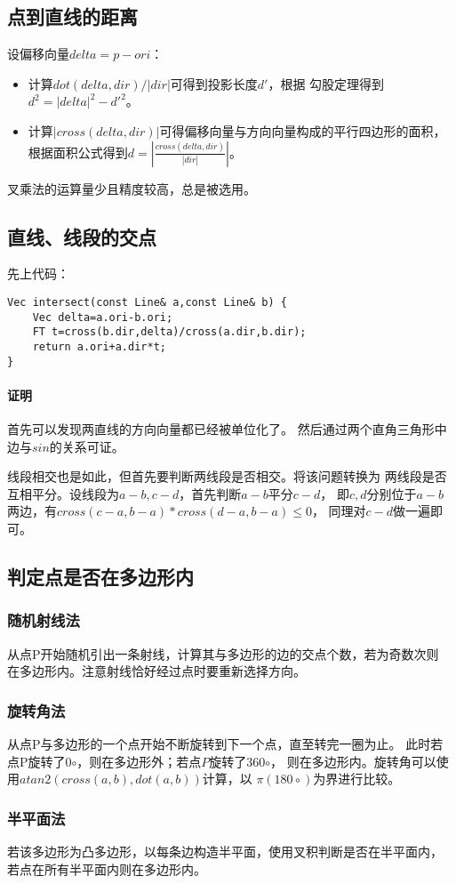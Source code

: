 \subsection{点到直线的距离}
设偏移向量$delta=p-ori$：
\begin{itemize}
	\item 计算$dot(delta,dir)/|dir|$可得到投影长度$d'$，根据
	      勾股定理得到$d^2=|delta|^2-d'^2$。
	\item 计算$|cross(delta,dir)|$可得偏移向量与方向向量构成的平行四边形的面积，
	      根据面积公式得到$d=|\frac{cross(delta,dir)}{|dir|}|$。
\end{itemize}
叉乘法的运算量少且精度较高，总是被选用。
\subsection{直线、线段的交点}
先上代码：
\begin{lstlisting}
Vec intersect(const Line& a,const Line& b) {
    Vec delta=a.ori-b.ori;
    FT t=cross(b.dir,delta)/cross(a.dir,b.dir);
    return a.ori+a.dir*t;
}
\end{lstlisting}
\paragraph{证明} 首先可以发现两直线的方向向量都已经被单位化了。
然后通过两个直角三角形中边与$sin$的关系可证。

线段相交也是如此，但首先要判断两线段是否相交。将该问题转换为
两线段是否互相平分。设线段为$a-b,c-d$，首先判断$a-b$平分$c-d$，
即$c,d$分别位于$a-b$两边，有$cross(c-a,b-a)*cross(d-a,b-a)\leq 0$，
同理对$c-d$做一遍即可。
\subsection{判定点是否在多边形内}
\subsubsection{随机射线法}
从点P开始随机引出一条射线，计算其与多边形的边的交点个数，若为奇数次则
在多边形内。注意射线恰好经过点时要重新选择方向。
\subsubsection{旋转角法}
从点P与多边形的一个点开始不断旋转到下一个点，直至转完一圈为止。
此时若点P旋转了0$\circ$，则在多边形外；若点$P$旋转了360$\circ$，
则在多边形内。旋转角可以使用$atan2(cross(a,b),dot(a,b))$计算，以
$\pi(180\circ)$为界进行比较。
\subsubsection{半平面法}
若该多边形为凸多边形，以每条边构造半平面，使用叉积判断是否在半平面内，
若点在所有半平面内则在多边形内。
